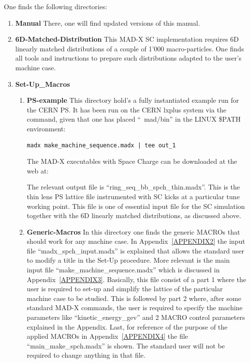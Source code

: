 One finds the following directories:
\begin{enumerate}
\item{\bf Manual}\newline
  There, one will find updated versions of this manual.
\item{\bf 6D-Matched-Distribution}\newline
  This MAD-X SC implementation requires 6D linearly matched
  distributions of a couple of 1'000 macro-particles. One finds all
  tools and instructions to prepare such distributions adapted to the
  user's machine case.
\item{\bf Set-Up\_Macros}\newline
  \begin{enumerate}
    At this location one finds the following directories:
  \item{\bf PS-example}\newline
    This directory hold's a fully instantiated example run for the
    CERN PS. It has been run on the CERN lxplus system via the
    command, given that one has placed ``~mad/bin'' in the LINUX
    \$PATH environment:
    \begin{verbatim}
madx make_machine_sequence.madx | tee out_1
  \end{verbatim}
    The MAD-X executables with Space Charge can be downloaded at the
    web at:

The relevant output file is
    ``ring\_seq\_bb\_spch\_thin.madx''. This is the thin lens PS
    lattice file instrumented with SC kicks at a particular tune
    working point. This file is one of essential input file for
    the SC simulation together with the 6D linearly matched
    distributions, as discussed above.
  \item{\bf Generic-Macros}\newline
    In this directory one finds the generic MACROs that should work
    for any machine case. In Appendix~\ref{APPENDIX2} the input file
    ``madx\_spch\_input.madx'' is explained that allows the standard
    user to modify a title in the Set-Up procedure. More relevant is
    the main input file ``make\_machine\_sequence.madx'' which is
    discussed in Appendix~\ref{APPENDIX3}. Basically, this file
    consist of a part 1 where the user is required to set-up and
    simplify the lattice of the particular machine case to be
    studied. This is followed by part 2 where, after some standard
    MAD-X commands, the user is required to specify the machine
    parameters like ``kinetic\_energy\_gev'' and 2 MACRO control
    parameters explained in the Appendix. Last, for reference of the
    purpose of the applied MACROs in Appendix~\ref{APPENDIX4} the file
    ``main\_make\_spch.madx'' is shown. The standard user will not be
    required to change anything in that file.
  \end{enumerate}
\end{enumerate}

